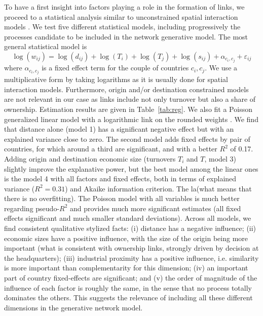 \documentclass[11pt]{article}
\begin{document}
To have a first insight into factors playing a role in the formation of links, we proceed to a statistical analysis similar to unconstrained spatial interaction models \cite{wilson1975some}. We test five different statistical models, including progressively the processes candidate to be included in the network generative model. The most general statistical model is
\[
\log(w_{ij}) = \log(d_{ij}) + \log(T_i) + \log(T_j) + \log(s_{ij}) + \alpha_{c_i,c_j} + \varepsilon_{ij}
\]
where $\alpha_{c_i,c_j}$ is a fixed effect term for the couple of countries $c_i,c_j$. We use a multiplicative form by taking logarithms as it is usually done for spatial interaction models. Furthermore, origin and/or destination constrained models are not relevant in our case as links include not only turnover but also a share of ownership. Estimation results are given in Table~\ref{tab:reg}. We also fit a Poisson generalized linear model with a logarithmic link on the rounded weights \cite{flowerdew1988fitting}. We find that distance alone (model 1) has a significant negative effect but with an explained variance close to zero. The second model adds fixed effects by pair of countries, for which around a third are significant, and with a better $R^2$ of 0.17. Adding origin and destination economic size (turnovers $T_i$ and $T$, model 3) slightly improve the explanative power, but the best model among the linear ones is the model 4 with all factors and fixed effects, both in terms of explained variance ($R^2 = 0.31$) and Akaike information criterion. The la(what means that there is no overfitting). The Poisson model with all variables is much better regarding pseudo-$R^2$ and provides much more significant estimates (all fixed effects significant and much smaller standard deviations). Across all models, we find consistent qualitative stylized facts: (i) distance has a negative influence; (ii) economic sizes have a positive influence, with the size of the origin being more important (what is consistent with ownership links, strongly driven by decision at the headquarters); (iii) industrial proximity has a positive influence, i.e. similarity is more important than complementarity for this dimension; (iv) an important part of country fixed-effects are significant; and (v) the order of magnitude of the influence of each factor is roughly the same, in the sense that no process totally dominates the others. This suggests the relevance of including all these different dimensions in the generative network model.
\end{document}
